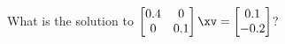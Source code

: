 \begin{activity}
What is the solution to \(\begin{bmatrix} 0.4&0\\0&0.1 \end{bmatrix}\xv=\begin{bmatrix} 0.1\\-0.2 \end{bmatrix}\)?
\end{activity}



\begin{comment}
Diagonal matrices are `stretchers' in the coordinate directions, e.g.~the rack.  They also can reflect which changes orientation.  They are a first example of a linear transformation.  Their inverse has to undo the stretching.
\end{comment}

